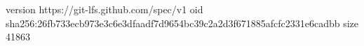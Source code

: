 version https://git-lfs.github.com/spec/v1
oid sha256:26fb733ecb973e3c6e3dfaadf7d9654bc39c2a2d3f671885afcfc2331e6cadbb
size 41863
